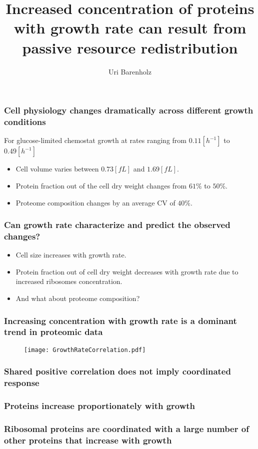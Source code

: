 \documentclass{beamer}
\title{Increased concentration of proteins with growth rate can result from passive resource redistribution}
\author{Uri Barenholz}
\begin{document}
\maketitle
\begin{frame}
\frametitle{Cell physiology changes dramatically across different growth conditions}
For glucose-limited chemostat growth at rates ranging from $0.11 [h^{-1}]$ to $0.49 [h^{-1}]$
\begin{itemize}
\item Cell volume varies between $0.73 [fL]$ and $1.69 [fL]$.
\item Protein fraction out of the cell dry weight changes from $61\%$ to $50\%$.
\item Proteome composition changes by an average CV of $40\%$.
\end{itemize}
\end{frame}

\begin{frame}
\frametitle{Can growth rate characterize and predict the observed changes?}
\begin{itemize}
\item Cell size increases with growth rate.
\item Protein fraction out of cell dry weight decreases with growth rate due to increased ribosomes concentration.
\item And what about proteome composition?
\end{itemize}
\end{frame}

\begin{frame}
\frametitle{Increasing concentration with growth rate is a dominant trend in proteomic data}
\begin{figure}[h!]
\centering
\texttt{[image: GrowthRateCorrelation.pdf]}
\end{figure}
\end{frame}

\begin{frame}
\frametitle{Shared positive correlation does not imply coordinated response}
\end{frame}

\begin{frame}
\frametitle{Proteins increase proportionately with growth}
\end{frame}

\begin{frame}
\frametitle{Ribosomal proteins are coordinated with a large number of other proteins that increase with growth}
\end{frame}
\end{document}
